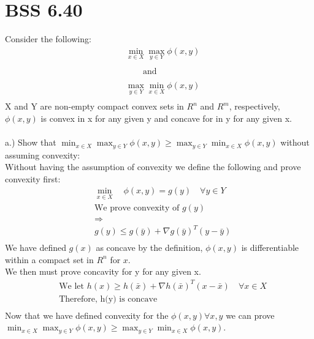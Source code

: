 \documentclass[12pt]{article}
\begin{document}
\section{BSS 6.40}
    Consider the following: \\
        \begin{align*}
            &\min_{x \in X} \max_{y \in Y} \phi(x,y)\\\\
            &\quad \quad \text{and}\\\\
            &\max_{y \in Y} \min_{x \in X} \phi(x,y)\\
        \end{align*}
    X and Y are non-empty compact convex sets in $R^n$ and $R^m$, respectively, $\phi (x,y)$ is convex in x for any given y and concave for in y for any given x.\\\\
    a.) Show that $\min_{x \in X} \max_{y \in Y} \phi(x,y) \geq \max_{y \in Y} \min_{x \in X} \phi(x,y)$ without assuming convexity:\\
    Without having the assumption of convexity we define the following and prove convexity first:\\
        \begin{align*}
            &\min_{x \in X} \quad \phi(x,y) = g(y) \quad \forall y \in Y\\
            &\text{We prove convexity of }g(y)\\
            &\Longrightarrow\\
            &g(y) \leq g(\bar y) + \nabla g(\bar y)^T (y- \bar y)\\
        \end{align*}
    We have defined $g(x)$ as concave by the definition, $\phi (x,y)$ is differentiable within a compact set in $R^n$ for $x$. \\
    We then must prove concavity for y for any given x.\\
        \begin{align*}
            &\text{We let }h(x) \geq h(\bar x) + \nabla h(\bar x)^T (x - \bar x) \quad \forall x \in X\\
            &\text{Therefore, h(y) is concave}\\
        \end{align*}
    Now that we have defined convexity for the $\phi (x,y) \forall x,y$ we can prove $\min_{x \in X} \max_{y \in Y} \phi(x,y) \geq \max_{y \in Y} \min_{x \in X} \phi(x,y)$. \\
\end{document}
